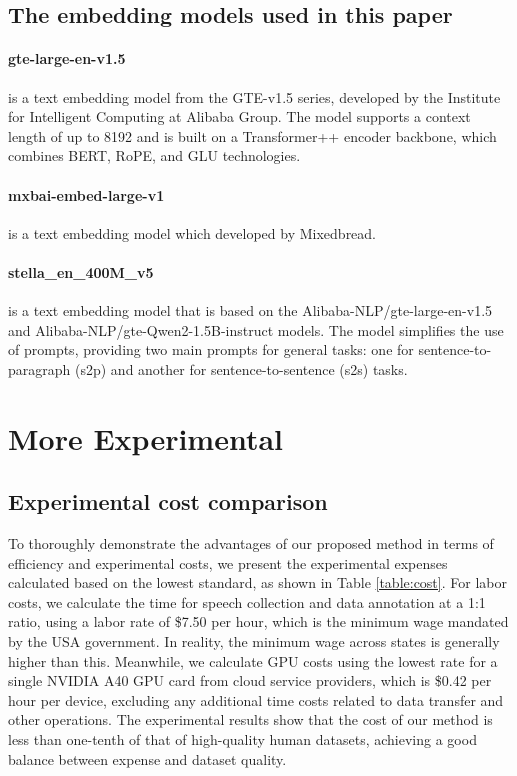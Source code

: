 \documentclass[11pt]{article}
\begin{document}
	
	
	\subsection{The embedding models used in this paper}\label{embedding models}
	
	\paragraph{gte-large-en-v1.5} is a text embedding model from the GTE-v1.5 series, developed by the Institute for Intelligent Computing at Alibaba Group. The model supports a context length of up to 8192 and is built on a Transformer++ encoder backbone, which combines BERT, RoPE, and GLU technologies.
	
	
	\paragraph{mxbai-embed-large-v1} is a text embedding model which developed by Mixedbread.
	
	\paragraph{stella\_en\_400M\_v5}is a text embedding model that is based on the Alibaba-NLP/gte-large-en-v1.5 and Alibaba-NLP/gte-Qwen2-1.5B-instruct models. The model simplifies the use of prompts, providing two main prompts for general tasks: one for sentence-to-paragraph (s2p) and another for sentence-to-sentence (s2s) tasks.
	


	
	
	
	\section{More Experimental}
	\subsection{Experimental cost comparison}
	To thoroughly demonstrate the advantages of our proposed method in terms of efficiency and experimental costs, we present the experimental expenses calculated based on the lowest standard, as shown in Table \ref{table:cost}. For labor costs, we calculate the time for speech collection and data annotation at a 1:1 ratio, using a labor rate of \$7.50 per hour, which is the minimum wage mandated by the USA government. In reality, the minimum wage across states is generally higher than this. Meanwhile, we calculate GPU costs using the lowest rate for a single NVIDIA A40 GPU card from cloud service providers, which is \$0.42 per hour per device, excluding any additional time costs related to data transfer and other operations. The experimental results show that the cost of our method is less than one-tenth of that of high-quality human datasets, achieving a good balance between expense and dataset quality.
	
\end{document}
